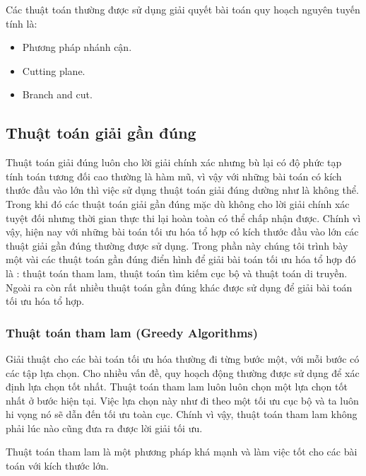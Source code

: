 \documentclass[a4paper,12pt]{report}
\begin{document}
Các thuật toán thường được sử dụng giải quyết bài toán quy hoạch nguyên tuyến tính là: 
\begin{itemize}
\item Phương pháp nhánh cận.
\item Cutting plane.
\item Branch and cut.
\end{itemize}
\subsection{Thuật toán giải gần đúng}
Thuật toán giải đúng luôn cho lời giải chính xác nhưng bù lại có độ phức tạp tính toán tương đối cao thường là hàm mũ, vì vậy với những bài toán có kích thước đầu vào lớn thì việc sử dụng thuật toán giải đúng dường như là không thể. Trong khi đó các thuật toán giải gần đúng mặc dù không cho lời giải chính xác tuyệt đối nhưng thời gian thực thi lại hoàn toàn có thể chấp nhận được. Chính vì vậy, hiện nay với những bài toán tối ưu hóa tổ hợp có kích thước đầu vào lớn các thuật giải gần đúng thường được sử dụng. Trong phần này chúng tôi trình bày một vài các thuật toán gần đúng điển hình để giải bài toán tối ưu hóa tổ hợp đó là : thuật toán tham lam, thuật toán tìm kiếm cục bộ và thuật toán di truyền. Ngoài ra còn rất nhiều thuật toán gần đúng khác được sử dụng để giải bài toán tối ưu hóa tổ hợp.
\subsubsection{Thuật toán tham lam (Greedy Algorithms)}
Giải thuật cho các bài toán tối ưu hóa thường đi từng bước một, với mỗi bước có các tập lựa chọn. Cho nhiều vấn đề, quy hoạch động thường được sử dụng để xác định lựa chọn tốt nhất. Thuật toán tham lam \cite{ITA} luôn luôn chọn một lựa chọn tốt nhất ở bước hiện tại. Việc lựa chọn này như  đi theo một tối ưu cục bộ và ta luôn hi vọng nó sẽ dẫn đến tối ưu toàn cục. Chính vì vậy, thuật toán tham lam không phải lúc nào cũng đưa ra được lời giải tối ưu. 

Thuật toán tham lam là một phương pháp khá mạnh và làm việc tốt cho các bài toán với kích thước lớn. 


%
%
\end{document}
